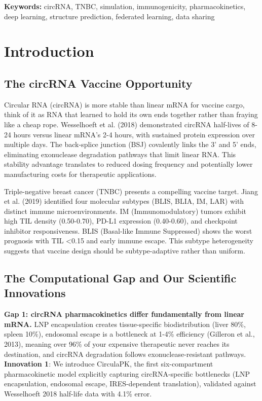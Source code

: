 \documentclass[12pt]{article}
\begin{document}
\textbf{Keywords:} circRNA, TNBC, simulation, immunogenicity, pharmacokinetics, deep learning, structure prediction, federated learning, data sharing

\section{Introduction}

\subsection{The circRNA Vaccine Opportunity}

Circular RNA (circRNA) is more stable than linear mRNA for vaccine cargo, think of it as RNA that learned to hold its own ends together rather than fraying like a cheap rope. Wesselhoeft et al. (2018) demonstrated circRNA half-lives of 8-24 hours versus linear mRNA's 2-4 hours, with sustained protein expression over multiple days. The back-splice junction (BSJ) covalently links the 3' and 5' ends, eliminating exonuclease degradation pathways that limit linear RNA. This stability advantage translates to reduced dosing frequency and potentially lower manufacturing costs for therapeutic applications.

Triple-negative breast cancer (TNBC) presents a compelling vaccine target. Jiang et al. (2019) identified four molecular subtypes (BLIS, BLIA, IM, LAR) with distinct immune microenvironments. IM (Immunomodulatory) tumors exhibit high TIL density (0.50-0.70), PD-L1 expression (0.40-0.60), and checkpoint inhibitor responsiveness. BLIS (Basal-like Immune Suppressed) shows the worst prognosis with TIL <0.15 and early immune escape. This subtype heterogeneity suggests that vaccine design should be subtype-adaptive rather than uniform.

\subsection{The Computational Gap and Our Scientific Innovations}

\textbf{Gap 1: circRNA pharmacokinetics differ fundamentally from linear mRNA.} LNP encapsulation creates tissue-specific biodistribution (liver 80\%, spleen 10\%), endosomal escape is a bottleneck at 1-4\% efficiency (Gilleron et al., 2013), meaning over 96\% of your expensive therapeutic never reaches its destination, and circRNA degradation follows exonuclease-resistant pathways. \textbf{Innovation 1}: We introduce CirculaPK, the first six-compartment pharmacokinetic model explicitly capturing circRNA-specific bottlenecks (LNP encapsulation, endosomal escape, IRES-dependent translation), validated against Wesselhoeft 2018 half-life data with 4.1\% error.
\end{document}
